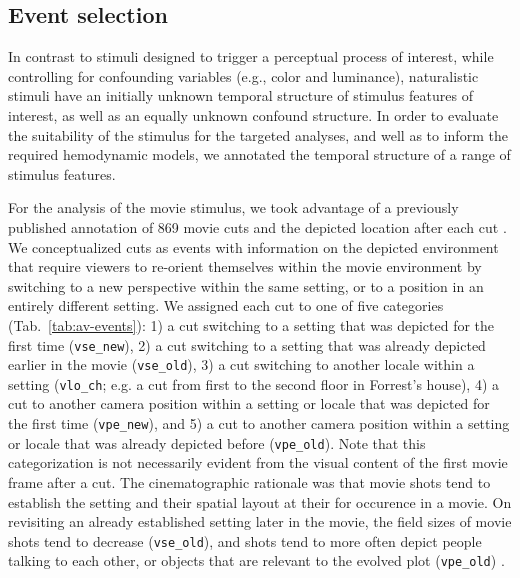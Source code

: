\documentclass[english]{article}
\begin{document}
\subsection{Event selection} \label{rationale}

In contrast to stimuli designed to trigger a perceptual process of interest,
while controlling for confounding variables (e.g., color and luminance),
naturalistic stimuli have an initially unknown temporal structure
of stimulus features of interest, as well as an equally unknown confound structure.
In order to evaluate the suitability of the stimulus for the targeted analyses,
and well as to inform the required hemodynamic models, we annotated the temporal
structure of a range of stimulus features.

For the analysis of the movie stimulus, we took advantage of a previously
published annotation of 869 movie cuts and the depicted location after each cut
\citep{haeusler2016cutanno}.
We conceptualized cuts as events with information on the depicted environment
that require viewers to re-orient themselves within the movie environment by
switching to a new perspective within the same setting, or to a position in an
entirely different setting.
We assigned each cut to one of five categories (Tab.~\ref{tab:av-events}):
%
1) a cut switching to a setting that was depicted for the first time
(\texttt{vse\_new}),
%
2) a cut switching to a setting that was already depicted earlier in the movie
(\texttt{vse\_old}),
%
3) a cut switching to another locale within a setting (\texttt{vlo\_ch}; e.g. a
cut from first to the second floor in Forrest's house),
%
4) a cut to another camera position within a setting or locale that was depicted
for the first time (\texttt{vpe\_new}), and
%
5) a cut to another camera position within a setting or locale that was already
depicted before (\texttt{vpe\_old}).
Note that this categorization is not necessarily evident from the visual content
of the first movie frame after a cut.
The cinematographic rationale was that movie shots tend to establish the setting
and their spatial layout at their for occurence in a movie.
On revisiting an already established setting later in the movie, the field sizes
of movie shots tend to decrease (\texttt{vse\_old}), and shots tend to
more often depict people talking to each other, or objects that are relevant to
the evolved plot (\texttt{vpe\_old}) \citep{brown2012cinematography,
mercado2011filmmakers}.
\end{document}
